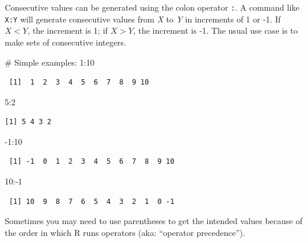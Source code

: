 \documentclass[
  13,
  letterpaper,
]{report}
\newenvironment{Shaded}{\begin{snugshade}}{\end{snugshade}}
\newcommand{\CommentTok}[1]{\textcolor[rgb]{0.37,0.37,0.37}{#1}}
\newcommand{\DecValTok}[1]{\textcolor[rgb]{0.68,0.00,0.00}{#1}}
\newcommand{\SpecialCharTok}[1]{\textcolor[rgb]{0.37,0.37,0.37}{#1}}
\begin{document}
Consecutive values can be generated using the colon operator \texttt{:}.
A command like \texttt{X:Y} will generate consecutive values from
\emph{X} to \emph{Y} in increments of 1 or -1. If \(X<Y\), the increment
is 1; if \(X>Y\), the increment is -1. The usual use case is to make
sets of consecutive integers.

\begin{Shaded}
\begin{Highlighting}[]
\CommentTok{\# Simple examples:}
\DecValTok{1}\SpecialCharTok{:}\DecValTok{10}
\end{Highlighting}
\end{Shaded}

\begin{verbatim}
 [1]  1  2  3  4  5  6  7  8  9 10
\end{verbatim}

\begin{Shaded}
\begin{Highlighting}[]
\DecValTok{5}\SpecialCharTok{:}\DecValTok{2}
\end{Highlighting}
\end{Shaded}

\begin{verbatim}
[1] 5 4 3 2
\end{verbatim}

\begin{Shaded}
\begin{Highlighting}[]
\SpecialCharTok{{-}}\DecValTok{1}\SpecialCharTok{:}\DecValTok{10}
\end{Highlighting}
\end{Shaded}

\begin{verbatim}
 [1] -1  0  1  2  3  4  5  6  7  8  9 10
\end{verbatim}

\begin{Shaded}
\begin{Highlighting}[]
\DecValTok{10}\SpecialCharTok{:{-}}\DecValTok{1}
\end{Highlighting}
\end{Shaded}

\begin{verbatim}
 [1] 10  9  8  7  6  5  4  3  2  1  0 -1
\end{verbatim}

Sometimes you may need to use parentheses to get the intended values
because of the order in which R runs operators (aka: ``operator
precedence'').
\end{document}
